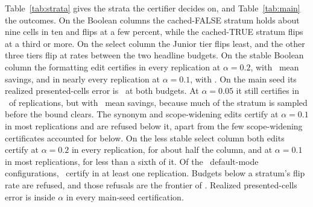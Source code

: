 Table~\ref{tab:strata} gives the strata the certifier decides on, and
Table~\ref{tab:main} the outcomes. On the Boolean columns the
cached-FALSE stratum holds about nine cells in ten and flips at a few
percent, while the cached-TRUE stratum flips at a third or more. On the
select column the Junior tier flips least, and the other three tiers
flip at rates between the two headline budgets. On the stable Boolean
column the formatting edit certifies in every replication at
$\alpha{=}0.2$, with \benchSavings\ mean savings, and in nearly every
replication at $\alpha{=}0.1$, with \frontierB. On the main seed its
realized presented-cells error is \benchRealized\ at both budgets. At
$\alpha{=}0.05$ it still certifies in \edgeCertRate\ of replications,
but with \edgeSavingsMean\ mean savings, because much of the stratum is
sampled before the bound clears. The synonym and scope-widening edits
certify at $\alpha{=}0.1$ in most replications and are refused below it,
apart from the few scope-widening certificates accounted for below. On
the less stable select column both edits certify at $\alpha{=}0.2$ in
every replication, for about half the column, and at $\alpha{=}0.1$ in
most replications, for less than a sixth of it. Of the \tableConfigs\
default-mode configurations, \certifyingConfigs\ certify in at least
one replication. Budgets below a stratum's flip rate are refused, and
those refusals are the frontier of \figref{fig:frontier}. Realized
presented-cells error is inside $\alpha$ in every main-seed
certification.

\begin{table}[t]
\caption{The strata of the five edit pairs: the cells of each cached
value on the $n{=}\benchN$ evaluation vector, and how many of them flip
under the edit.}
\label{tab:strata}
\centering\small
\setlength{\tabcolsep}{4pt}

\end{table}

